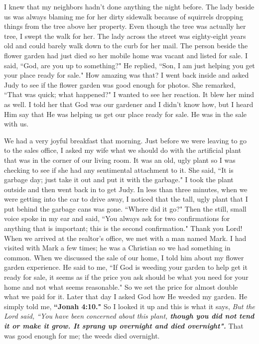 \documentclass[oneside]{book}
\begin{document}
I knew that my neighbors hadn't done anything the night before. The lady beside us was always blaming me for her dirty sidewalk because of squirrels dropping things from the tree above her property. Even though the tree was actually her tree, I swept the walk for her. The lady across the street was eighty-eight years old and could barely walk down to the curb for her mail. The person beside the flower garden had just died so her mobile home was vacant and listed for sale. I said, ``God, are you up to something?" He replied, ``Son, I am just helping you get your place ready for sale." How amazing was that? I went back inside and asked Judy to see if the flower garden was good enough for photos. She remarked, ``That was quick; what happened?" I  wanted to see her reaction. It blew her mind as well. I told her that God was our gardener and I didn't know how, but I heard Him say that He was helping us get our place ready for sale. He was in the sale with us.

We had a very joyful breakfast that morning. Just before we were leaving to go to the sales office, I asked my wife what we should do with the artificial plant that was in the corner of our living room. It was an old, ugly plant so I was checking to see if she had any sentimental attachment to it. She said, ``It is garbage day; just take it out and put it with the garbage." I took the plant outside and then went back in to get Judy. In less than three minutes, when we were getting into the car to drive away, I noticed that the tall, ugly plant that I put behind the garbage cans was gone. ``Where did it go?" Then the still, small voice spoke in my ear and said, ``You always ask for two confirmations for anything that is important; this is the second confirmation." Thank you Lord! When we arrived at the realtor's office, we met with a man named Mark. I had visited with Mark a few times; he was a Christian so we had something in common. When we discussed the sale of our home, I told him about my flower garden experience. He said to me, ``If God is weeding your garden to help get it ready for sale, it seems as if the price you ask should be what you need for your home and not what seems reasonable." So we set the price for almost double what we paid for it. Later that day I asked God how He weeded my garden. He simply told me, \textbf{``Jonah 4:10."} So I looked it up and this is what it says, \textit{But the Lord said, ``You have been concerned about this plant, \textbf{though you did not tend it or make it grow. It sprang up overnight and died overnight".}} That was good enough for me; the weeds died overnight.
\end{document}
